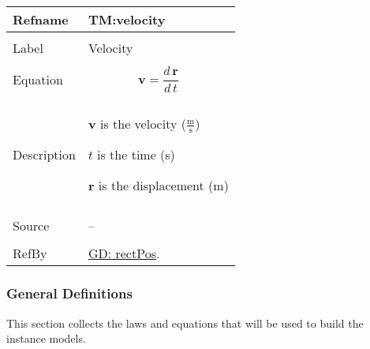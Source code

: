 \documentclass[12pt]{article}
\begin{document}
\noindent \begin{minipage}{\textwidth}
\begin{tabular}{p{} p{}}
\toprule \textbf{Refname} & \textbf{TM:velocity}
\label{TM:velocity}
\\ \midrule \\
Label & Velocity
\\ \midrule \\
Equation & \begin{displaymath}
           \mathbf{v}=\frac{d\,\mathbf{r}}{d\,t}
           \end{displaymath}
\\ \midrule \\
Description & \begin{symbDescription}
              \item{$\mathbf{v}$ is the velocity ($\frac{\text{m}}{\text{s}}$)}
              \item{$t$ is the time (s)}
              \item{$\mathbf{r}$ is the displacement (m)}
              \end{symbDescription}
\\ \midrule \\
Source & --
\\ \midrule \\
RefBy & \hyperref[GD:rectPos]{GD: rectPos}.
\\ \bottomrule \end{tabular}
\end{minipage}
\subsubsection{General Definitions}
\label{Sec:GDs}
This section collects the laws and equations that will be used to build the instance models.
\par~
\end{document}
